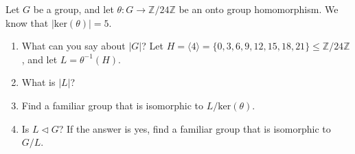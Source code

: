 \documentclass[12pt,letterpaper,boxed]{hmcpset}
\begin{document}
\begin{problem}[11.5.2]
Let $G$ be a group, and let $\theta: G \rightarrow \mathbb{Z}/24\mathbb{Z}$ be an onto group homomorphism. We know that $\vert \text{ker}(\theta) \vert = 5$.
\begin{enumerate}[label=\alph*]
\item What can you say about $\vert G \vert$?
\newline
\newline
{\setlength{\parindent}{0cm}
Let $H = \langle 4 \rangle = \{0,3,6,9,12,15,18,21\} \leq \mathbb{Z}/24\mathbb{Z}$, and let $L = \theta^{-1}(H)$.
}
\item What is $\vert L \vert$?
\item Find a familiar group that is isomorphic to $L/\text{ker}(\theta)$.
\item Is $L \triangleleft G$? If the answer is yes, find a familiar group that is isomorphic to $G/L$.
\end{enumerate}
\end{problem}

\begin{solution}

\end{solution}
\end{document}
